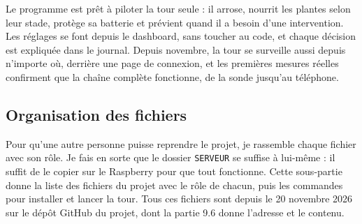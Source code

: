 Le programme est prêt à piloter la tour seule : il arrose, nourrit les plantes selon leur stade, protège sa batterie et prévient quand il a besoin d'une intervention. Les réglages se font depuis le dashboard, sans toucher au code, et chaque décision est expliquée dans le journal. Depuis novembre, la tour se surveille aussi depuis n'importe où, derrière une page de connexion, et les premières mesures réelles confirment que la chaîne complète fonctionne, de la sonde jusqu'au téléphone.

\subsection{Organisation des fichiers}

Pour qu'une autre personne puisse reprendre le projet, je rassemble chaque fichier avec son rôle. Je fais en sorte que le dossier \texttt{SERVEUR} se suffise à lui-même : il suffit de le copier sur le Raspberry pour que tout fonctionne. Cette sous-partie donne la liste des fichiers du projet avec le rôle de chacun, puis les commandes pour installer et lancer la tour. Tous ces fichiers sont depuis le 20 novembre 2026 sur le dépôt GitHub du projet, dont la partie 9.6 donne l'adresse et le contenu.

